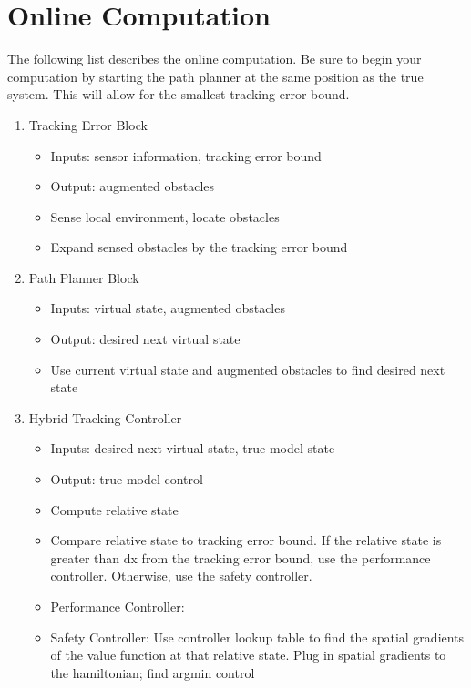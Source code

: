 \section{Online Computation \label{sec:online}}
The following list describes the online computation. Be sure to begin your computation by starting the path planner at the same position as the true system. This will allow for the smallest tracking error bound.
\begin{enumerate}
\item Tracking Error Block
\begin{itemize}
	\item Inputs: sensor information, tracking error bound
	\item Output: augmented obstacles
	\item Sense local environment, locate obstacles
	\item Expand sensed obstacles by the tracking error bound
\end{itemize}
\item Path Planner Block
\begin{itemize}
	\item Inputs: virtual  state, augmented obstacles
	\item Output: desired next virtual state
	\item Use current virtual state and augmented obstacles to find desired next state
\end{itemize}
\item Hybrid Tracking Controller
\begin{itemize}
	\item Inputs: desired next virtual state, true model state
	\item Output: true model control
	\item Compute relative state
	\item Compare relative state to tracking error bound. If the relative state is greater than dx from the tracking error bound, use the performance controller. Otherwise, use the safety controller.
	\item Performance Controller: 
	\item Safety Controller: Use controller lookup table to find the spatial gradients of the value function at that relative state. Plug in spatial gradients to the hamiltonian; find argmin control
\end{itemize}

\end{enumerate}
